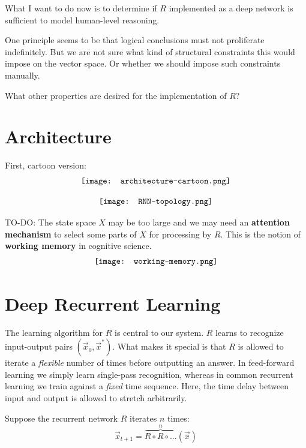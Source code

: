 \documentclass[orivec]{llncs}
\newcommand{\emp}[1]{\textbf{#1}}
\begin{document}
What I want to do now is to determine if $R$ implemented as a deep network is sufficient to model human-level reasoning.

One principle seems to be that logical conclusions must not proliferate indefinitely.  But we are not sure what kind of structural constraints this would impose on the vector space.  Or whether we should impose such constraints manually.

What other properties are desired for the implementation of $R$?

\section{Architecture}

First, cartoon version:
\begin{equation}
\vcenter{\hbox{\texttt{[image: architecture-cartoon.png]}}}
\end{equation}

\begin{equation}
\vcenter{\hbox{\texttt{[image: RNN-topology.png]}}}
\end{equation}

TO-DO:  The state space $X$ may be too large and we may need an \emp{attention mechanism} to select some parts of $X$ for processing by $R$.  This is the notion of \emp{working memory} in cognitive science.
\begin{equation}
\vcenter{\hbox{\texttt{[image: working-memory.png]}}}
\end{equation}

\section{Deep Recurrent Learning}

The learning algorithm for $R$ is central to our system.  $R$ learns to recognize input-output pairs $( \vec{x}_0, \vec{x}^* )$.  What makes it special is that $R$ is allowed to iterate a \textit{flexible} number of times before outputting an answer.  In feed-forward learning we simply learn single-pass recognition, whereas in common recurrent learning we train against a \textit{fixed} time sequence.  Here, the time delay between input and output is allowed to stretch arbitrarily.

Suppose the recurrent network $R$ iterates $n$ times:
\begin{equation}
\vec{x}_{t+1} = \overbrace{R \circ R \circ ...}^{n} (\vec{x})
\end{equation}
\end{document}
